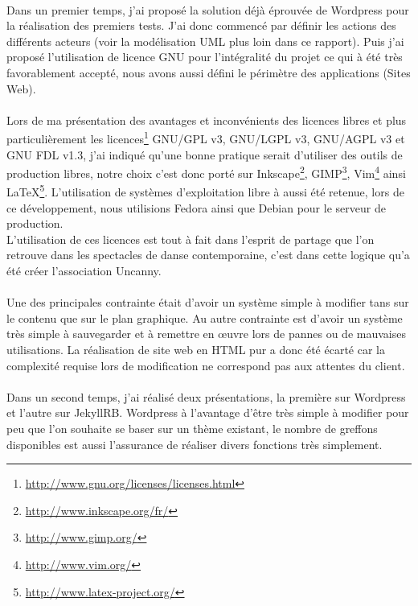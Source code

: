 \documentclass[11pt,a4paper]{report}
\begin{document}
		\paragraph*{}Dans un premier temps, j'ai proposé la solution déjà éprouvée de Wordpress pour la réalisation des premiers tests. J'ai donc commencé par définir les actions des différents acteurs (voir la modélisation UML plus loin dans ce rapport). Puis j'ai proposé l'utilisation de licence GNU pour l'intégralité du projet ce qui à été très favorablement accepté, nous avons aussi défini le périmètre des applications (Sites Web).
		\paragraph*{}Lors de ma présentation des avantages et inconvénients des licences libres et plus particulièrement les licences\footnote{\url{http://www.gnu.org/licenses/licenses.html}} GNU/GPL v3, GNU/LGPL v3, GNU/AGPL v3 et GNU FDL v1.3, j'ai indiqué qu'une bonne pratique serait d'utiliser des outils de production libres, notre choix c'est donc porté sur Inkscape\footnote{\url{http://www.inkscape.org/fr/}}, GIMP\footnote{\url{http://www.gimp.org/}}, Vim\footnote{\url{http://www.vim.org/}} ainsi \LaTeX \footnote{\url{http://www.latex-project.org/}}. L'utilisation de systèmes d'exploitation libre à aussi été retenue, lors de ce développement, nous utilisions Fedora ainsi que Debian pour le serveur de production.\\
		L'utilisation de ces licences est tout à fait dans l'esprit de partage que l'on retrouve dans les spectacles de danse contemporaine, c'est dans cette logique qu'a été créer l'association Uncanny.
		\paragraph*{}Une des principales contrainte était d'avoir un système simple à modifier tans sur le contenu que sur le plan graphique. Au autre contrainte est d'avoir un système très simple à sauvegarder et à remettre en œuvre lors de pannes ou de mauvaises utilisations. La réalisation de site web en HTML pur a donc été écarté car la complexité requise lors de modification ne correspond pas aux attentes du client.
		\paragraph*{}Dans un second temps, j'ai réalisé deux présentations, la première sur Wordpress et l'autre sur JekyllRB.
		Wordpress à l'avantage d'être très simple à modifier pour peu que l'on souhaite se baser sur un thème existant, le nombre de greffons disponibles est aussi l'assurance de réaliser divers fonctions très simplement.
\end{document}
